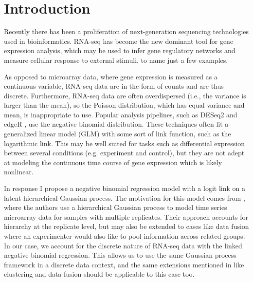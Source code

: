 \documentclass[11pt]{article}
\newcommand{\1}{\mathbf{1}}
\newcommand{\0}{\mathbf{0}}
\begin{document}
\section{Introduction}
Recently there has been a proliferation of next-generation sequencing technologies used in bioinformatics. RNA-seq has become the new dominant tool for gene expression analysis, which may be used to infer gene regulatory networks and measure cellular response to external stimuli, to name just a few examples. 

As opposed to microarray data, where gene expression is measured as a continuous variable, RNA-seq data are in the form of counts and are thus discrete. Furthermore, RNA-seq data are often overdispersed (i.e., the variance is larger than the mean), so the Poisson distribution, which has equal variance and mean, is inappropriate to use. Popular analysis pipelines, such as DESeq2 \cite{DESeq2} and edgeR \cite{edgeR}, use the negative binomial distribution. These techniques often fit a generalized linear model (GLM) with some sort of link function, such as the logarithmic link. This may be well suited for tasks such as differential expression between several conditions (e.g. experiment and control), but they are not adept at modeling the continuous time course of gene expression which is likely nonlinear.

In response I propose a negative binomial regression model with a logit link on a latent hierarchical Gaussian process. The motivation for this model comes from \cite{GPmicroarray}, where the authors use a hierarchical Gaussian process to model time series microarray data for samples with multiple replicates. Their approach accounts for hierarchy at the replicate level, but may also be extended to cases like data fusion where an experimenter would also like to pool information across related groups. In our case, we account for the discrete nature of RNA-seq data with the linked negative binomial regression. This allows us to use the same Gaussian process framework in a discrete data context, and the same extensions mentioned in \cite{GPmicroarray} like clustering and data fusion should be applicable to this case too.

\end{document}
